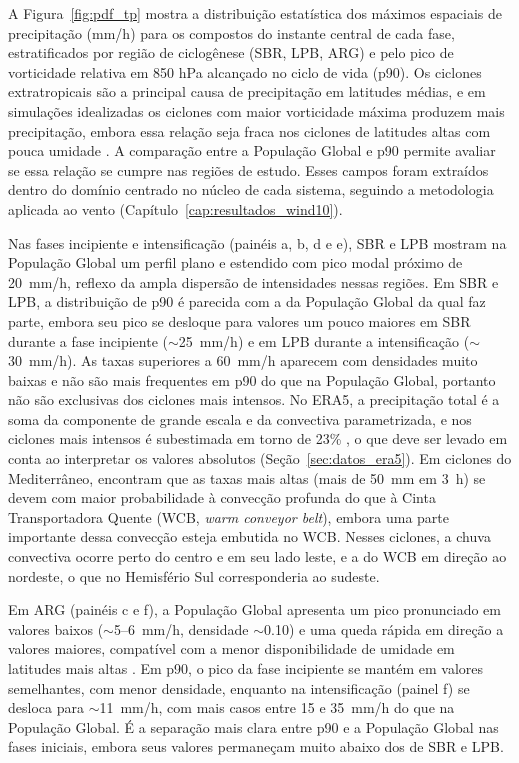 A Figura~\ref{fig:pdf_tp} mostra a distribuição estatística dos máximos espaciais de precipitação (mm/h) para os compostos do instante central de cada fase, estratificados por região de ciclogênese (SBR, LPB, ARG) e pelo pico de vorticidade relativa em 850 hPa alcançado no ciclo de vida (p90).
Os ciclones extratropicais são a principal causa de precipitação em latitudes médias, e em simulações idealizadas os ciclones com maior vorticidade máxima produzem mais precipitação, embora essa relação seja fraca nos ciclones de latitudes altas com pouca umidade \citep{sinclair2023relationship}. A comparação entre a População Global e p90 permite avaliar se essa relação se cumpre nas regiões de estudo.
Esses campos foram extraídos dentro do domínio centrado no núcleo de cada sistema, seguindo a metodologia aplicada ao vento (Capítulo~\ref{cap:resultados_wind10}).

Nas fases incipiente e intensificação (painéis a, b, d e e), SBR e LPB mostram na População Global um perfil plano e estendido com pico modal próximo de 20~mm/h, reflexo da ampla dispersão de intensidades nessas regiões.
Em SBR e LPB, a distribuição de p90 é parecida com a da População Global da qual faz parte, embora seu pico se desloque para valores um pouco maiores em SBR durante a fase incipiente (${\sim}$25~mm/h) e em LPB durante a intensificação (${\sim}$30~mm/h). As taxas superiores a 60~mm/h aparecem com densidades muito baixas e não são mais frequentes em p90 do que na População Global, portanto não são exclusivas dos ciclones mais intensos.
No ERA5, a precipitação total é a soma da componente de grande escala e da convectiva parametrizada, e nos ciclones mais intensos é subestimada em torno de 23\% \citep{chen2024evaluation}, o que deve ser levado em conta ao interpretar os valores absolutos (Seção~\ref{sec:datos_era5}). Em ciclones do Mediterrâneo, \citet{flaounas2018heavy} encontram que as taxas mais altas (mais de 50~mm em 3~h) se devem com maior probabilidade à convecção profunda do que à Cinta Transportadora Quente (WCB, \textit{warm conveyor belt}), embora uma parte importante dessa convecção esteja embutida no WCB. Nesses ciclones, a chuva convectiva ocorre perto do centro e em seu lado leste, e a do WCB em direção ao nordeste, o que no Hemisfério Sul corresponderia ao sudeste.

Em ARG (painéis c e f), a População Global apresenta um pico pronunciado em valores baixos (${\sim}$5--6~mm/h, densidade ${\sim}$0.10) e uma queda rápida em direção a valores maiores, compatível com a menor disponibilidade de umidade em latitudes mais altas \citep{sinclair2023relationship}.
Em p90, o pico da fase incipiente se mantém em valores semelhantes, com menor densidade, enquanto na intensificação (painel f) se desloca para ${\sim}$11~mm/h, com mais casos entre 15 e 35~mm/h do que na População Global. É a separação mais clara entre p90 e a População Global nas fases iniciais, embora seus valores permaneçam muito abaixo dos de SBR e LPB.


